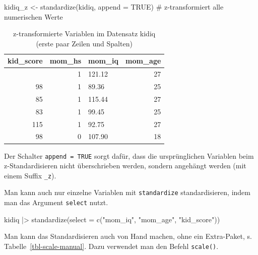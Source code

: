 \documentclass[
  ngerman,
  letterpaper,
  twoside,
  open=any]{scrbook}
\newenvironment{Shaded}{\begin{snugshade}}{\end{snugshade}}
\newcommand{\AttributeTok}[1]{\textcolor[rgb]{0.40,0.45,0.13}{#1}}
\newcommand{\CommentTok}[1]{\textcolor[rgb]{0.37,0.37,0.37}{#1}}
\newcommand{\ConstantTok}[1]{\textcolor[rgb]{0.56,0.35,0.01}{#1}}
\newcommand{\FunctionTok}[1]{\textcolor[rgb]{0.28,0.35,0.67}{#1}}
\newcommand{\NormalTok}[1]{\textcolor[rgb]{0.00,0.23,0.31}{#1}}
\newcommand{\OtherTok}[1]{\textcolor[rgb]{0.00,0.23,0.31}{#1}}
\newcommand{\SpecialCharTok}[1]{\textcolor[rgb]{0.37,0.37,0.37}{#1}}
\newcommand{\StringTok}[1]{\textcolor[rgb]{0.13,0.47,0.30}{#1}}
\theoremstyle{definition}
\theoremstyle{plain}
\theoremstyle{definition}
\theoremstyle{definition}
\theoremstyle{definition}
\theoremstyle{definition}
\theoremstyle{remark}
\begin{document}
\begin{Shaded}
\begin{Highlighting}[]
\NormalTok{kidiq\_z }\OtherTok{\textless{}{-}} 
  \FunctionTok{standardize}\NormalTok{(kidiq, }\AttributeTok{append =} \ConstantTok{TRUE}\NormalTok{)  }\CommentTok{\# z{-}transformiert alle numerischen Werte}
\end{Highlighting}
\end{Shaded}

{

\begin{longtable}[]{@{}rrlr@{}}

\caption{\label{tbl-kidiq-z}z-transformierte Variablen im Datensatz
kidiq (erste paar Zeilen und Spalten)}

\tabularnewline

\toprule\noalign{}
kid\_score & mom\_hs & mom\_iq & mom\_age \\
\midrule\noalign{}
\endhead
\bottomrule\noalign{}
\endlastfoot
65 & 1 & 121.12 & 27 \\
98 & 1 & 89.36 & 25 \\
85 & 1 & 115.44 & 27 \\
83 & 1 & 99.45 & 25 \\
115 & 1 & 92.75 & 27 \\
98 & 0 & 107.90 & 18 \\

\end{longtable}

}

Der Schalter \texttt{append\ =\ TRUE} sorgt dafür, dass die
ursprünglichen Variablen beim z-Standardisieren nicht überschrieben
werden, sondern angehängt werden (mit einem Suffix \texttt{\_z}).

Man kann auch nur einzelne Variablen mit \texttt{standardize}
standardisieren, indem man das Argument \texttt{select} nutzt.

\begin{Shaded}
\begin{Highlighting}[]
\NormalTok{kidiq }\SpecialCharTok{|\textgreater{}} 
  \FunctionTok{standardize}\NormalTok{(}\AttributeTok{select =} \FunctionTok{c}\NormalTok{(}\StringTok{"mom\_iq"}\NormalTok{, }\StringTok{"mom\_age"}\NormalTok{, }\StringTok{"kid\_score"}\NormalTok{))}
\end{Highlighting}
\end{Shaded}

Man kann das Standardisieren auch von Hand machen, ohne ein Extra-Paket,
s. Tabelle~\ref{tbl-scale-manual}. Dazu verwendet man den Befehl
\texttt{scale()}.
\end{document}
